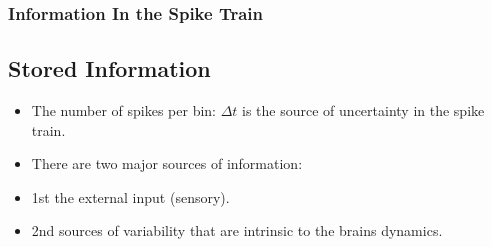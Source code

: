 \documentclass{beamer}
\begin{document}

\begin{frame}
\frametitle{Information In the Spike Train}
\subsection{Stored Information}
\begin{itemize}
\vfill \item The number of spikes per bin: $\Delta t$ is the source of uncertainty in the spike train.
\vfill \item There are two major sources of information: 
\vfill \item 1st the external input (sensory).
\vfill \item 2nd sources of variability that are intrinsic to the brains dynamics. 
\end{itemize}

\begin{figure}
\centering
\begin{minipage}{0.45\linewidth}
\end{minipage}
\end{figure}


\end{frame}
\end{document}
